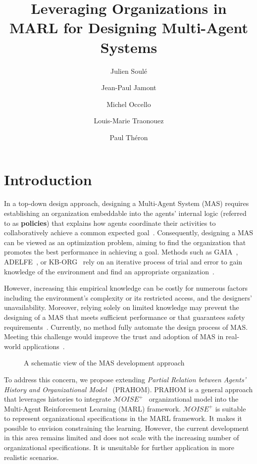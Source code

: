 \documentclass[sigconf,anonymous]{aamas}
\title[AAMAS-2025 CybMASDE]{Leveraging Organizations in MARL for Designing Multi-Agent Systems}
\author{Julien Soulé}
\affiliation{
  \institution{Univ. Grenoble Alpes}
  \city{Valence}
  \country{France}}
\author{Jean-Paul Jamont}
\affiliation{
  \institution{Univ. Grenoble Alpes}
  \city{Valence}
  \country{France}}
\author{Michel Occello}
\affiliation{
  \institution{Univ. Grenoble Alpes}
  \city{Valence}
  \country{France}}
\author{Louis-Marie Traonouez}
\affiliation{
  \institution{Thales Land and Air Systems, BU IAS}
  \city{Rennes}
  \country{France}}
\author{Paul Théron}
\affiliation{
  \institution{AICA IWG}
  \city{La Guillermie}
  \country{France}}
\begin{document}

\pagestyle{fancy}
\fancyhead{}


\maketitle



\section{Introduction}

In a top-down design approach, designing a Multi-Agent System (MAS) requires establishing an organization embeddable into the agents' internal logic (referred to as \textbf{policies}) that explains how agents coordinate their activities to collaboratively achieve a common expected goal~\cite{Picard2009}.
%
Consequently, designing a MAS can be viewed as an optimization problem, aiming to find the organization that promotes the best performance in achieving a goal. Methods such as GAIA~\cite{Wooldridge2000,Cernuzzi2014}, ADELFE~\cite{Mefteh2015}, or KB-ORG~\cite{Sims2008} rely on an iterative process of trial and error to gain knowledge of the environment and find an appropriate organization~\cite{Sims2008}.

However, increasing this empirical knowledge can be costly for numerous factors including the environment's complexity or its restricted access, and the designers' unavailability. Moreover, relying solely on limited knowledge may prevent the designing of a MAS that meets sufficient performance or that guarantees safety requirements~\cite{Mefteh2013}. Currently, no method fully automate the design process of MAS. Meeting this challenge would improve the trust and adoption of MAS in real-world applications~\cite{kok2006collaborative,omidshafiei2019learning}.

\begin{figure}[h!]
  \centering
  
  \caption{A schematic view of the MAS development approach}
  \label{fig:mas_development_cycle}
\end{figure}

To address this concern, we propose extending \textit{Partial Relation between Agents' History and Organizational Model}~\cite{soule2024} (PRAHOM). PRAHOM is a general approach that leverages histories to integrate $\mathcal{M}OISE^+$~\cite{Hubner2007} organizational model into the Multi-Agent Reinforcement Learning (MARL) framework. $\mathcal{M}OISE^+$ is suitable to represent organizational specifications in the MARL framework. It makes it possible to envision constraining the learning. However, the current development in this area remains limited and does not scale with the increasing number of organizational specifications. It is unsuitable for further application in more realistic scenarios.
\end{document}
